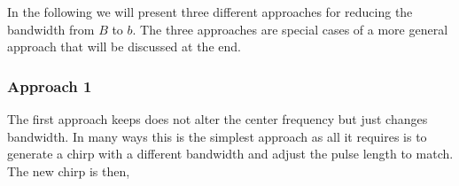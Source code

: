 \documentclass[]{article}
\begin{document}
In the following we will present three different approaches for reducing the bandwidth from $B$ to $b$. The three approaches are special cases of a more general approach that will be discussed at the end.

\subsubsection{Approach 1}
The first approach keeps does not alter the center frequency but just changes bandwidth. In many ways this is the simplest approach as all it requires is to generate a chirp with a different bandwidth and adjust the pulse length to match. The new chirp is then,




\newpage

\end{document}
